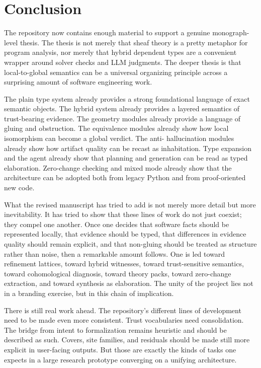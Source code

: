 \chapter{Conclusion}

The repository now contains enough material to support a genuine monograph-level thesis.
The thesis is not merely that sheaf theory is a pretty metaphor for program analysis, nor
merely that hybrid dependent types are a convenient wrapper around solver checks and LLM
judgments. The deeper thesis is that local-to-global semantics can be a universal
organizing principle across a surprising amount of software engineering work.

The plain type system already provides a strong foundational language of exact semantic
objects. The hybrid system already provides a layered semantics of trust-bearing evidence.
The geometry modules already provide a language of gluing and obstruction. The equivalence
modules already show how local isomorphism can become a global verdict. The anti-
hallucination modules already show how artifact quality can be recast as inhabitation.
Type expansion and the agent already show that planning and generation can be read as typed
elaboration. Zero-change checking and mixed mode already show that the architecture can be
adopted both from legacy Python and from proof-oriented new code.

What the revised manuscript has tried to add is not merely more detail but more inevitability.
It has tried to show that these lines of work do not just coexist; they compel one another.
Once one decides that software facts should be represented locally, that evidence should be
typed, that differences in evidence quality should remain explicit, and that non-gluing
should be treated as structure rather than noise, then a remarkable amount follows. One is
led toward refinement lattices, toward hybrid witnesses, toward trust-sensitive semantics,
toward cohomological diagnosis, toward theory packs, toward zero-change extraction, and
toward synthesis as elaboration. The unity of the project lies not in a branding exercise,
but in this chain of implication.

There is still real work ahead. The repository's different lines of development need to be
made even more consistent. Trust vocabularies need consolidation. The bridge from intent to
formalization remains heuristic and should be described as such. Covers, site families, and
residuals should be made still more explicit in user-facing outputs. But those are exactly
the kinds of tasks one expects in a large research prototype converging on a unifying
architecture.

